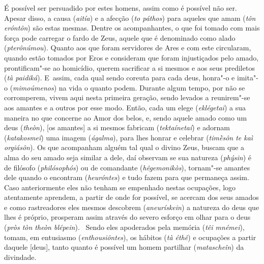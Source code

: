 É possível ser persuadido por estes homens, assim como é possível não
ser. Apesar disso, a causa (\emph{aitía}) e a afecção (\emph{to páthos})
para aqueles que amam (\emph{tôn eróntôn}) são estas mesmas. \bekker{[252c]}
Dentre os acompanhantes, o que foi tomado com mais força pode carregar o
fardo de Zeus, aquele que é denominado como alado (\emph{pterônúmou}).
Quanto aos que foram servidores de Ares e com este circularam, quando
estão tomados por Eros e consideram que foram injustiçados pelo amado,
prontificam"-se ao homicídio, querem sacrificar a si mesmos e aos seus
prediletos (\emph{tà paidiká}). E~assim, cada qual sendo coreuta para
cada deus, honra"-o e imita"-o (\emph{mimoúmenos}) na vida o quanto podem.
\bekker{[252d]} Durante algum tempo, por não se corromperem, vivem aqui nesta
primeira geração, sendo levados a reunirem"-se aos amantes e a outros por
esse modo. Então, cada um elege (\emph{eklégetai}) a sua maneira no que
concerne ao Amor dos belos, e, sendo aquele amado como um deus
(\emph{theòn}), [os amantes] a si mesmos fabricam
(\emph{tektaínetaí}) e adornam (\emph{katakosmeî}) uma imagem
(\emph{ágalma}), para lhes honrar e celebrar (\emph{timḕsôn te kaì
orgiásôn}). \bekker{[252e]} Os que acompanham alguém tal qual o divino Zeus,
buscam que a alma do seu amado seja similar a dele, daí observam se sua
natureza (\emph{phýsin}) é de filósofo (\emph{philósophós}) ou de
comandante (\emph{hêgemonikòs}), tornam"-se amantes dele quando o
encontram (\emph{heuróntes}) e tudo fazem para que permaneça assim. Caso
anteriormente eles não tenham se empenhado nestas ocupações, logo
atentamente aprendem, a partir de onde for possível, se acercam dos seus
amados e como rastreadores eles mesmos descobrem (\emph{aneurískein}) a
natureza do deus que lhes é próprio, prosperam assim através do severo
esforço em olhar para o deus (\emph{pròs tòn theòn blépein}).~\bekker{[253a]}
Sendo eles apoderados pela memória (\emph{têi mnémei}), tomam, em
entusiasmo (\emph{enthousiôntes}), os hábitos (\emph{tà éthê}) e
ocupações a partir daquele [deus], tanto quanto é possível um homem
partilhar (\emph{matascheîn}) da divindade.

